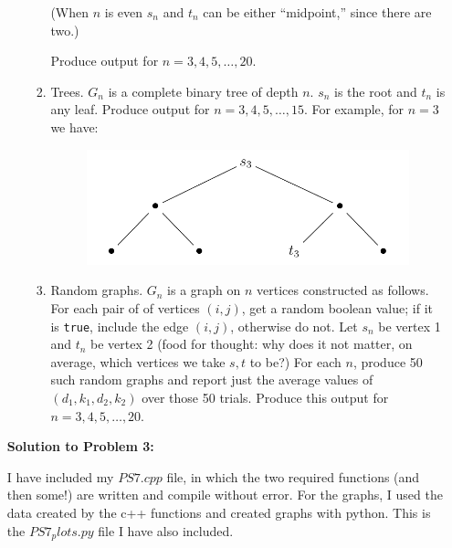 \documentclass[12pt]{article}
\begin{document}
\begin{enumerate}
\begin{enumerate}
\begin{enumerate}
	(When $n$ is even $s_n$ and $t_n$ can be either ``midpoint,'' since there are two.)
	
	Produce output for $n=3,4,5,\dotsc,20$.
	
	\item Trees. $G_n$ is a complete binary tree of depth $n$. $s_n$ is the root and $t_n$ is any leaf. Produce output for $n=3,4,5,\dotsc,15$. For example, for $n=3$ we have:
    \begin{figure}[H]
    \begin{center}
    \includegraphics[scale=0.6]{tree.png} 
    \end{center}
    \end{figure}
		
	\item Random graphs. $G_n$ is a graph on $n$ vertices constructed as follows. For each pair of of vertices $(i,j)$, get a random boolean value; if it is \texttt{true}, include the edge $(i,j)$, otherwise do not. Let $s_n$ be vertex 1 and $t_n$ be vertex 2 (food for thought: why does it not matter, on average, which vertices we take $s,t$ to be?) For each $n$, produce 50 such random graphs and report just the average values of $(d_1,k_1,d_2,k_2)$ over those 50 trials. Produce this output for $n=3,4,5,\dotsc,20$.
	\end{enumerate}
	\end{enumerate}
\pagebreak
\textbf{Solution to Problem 3:}

I have included my $PS7.cpp$ file, in which the two required functions (and then some!) are written and compile without error. For the graphs, I used the data created by the c++ functions and created graphs with python. This is the $PS7_plots.py$ file I have also included. 
\newline \smallskip


\end{enumerate}
\end{document}
